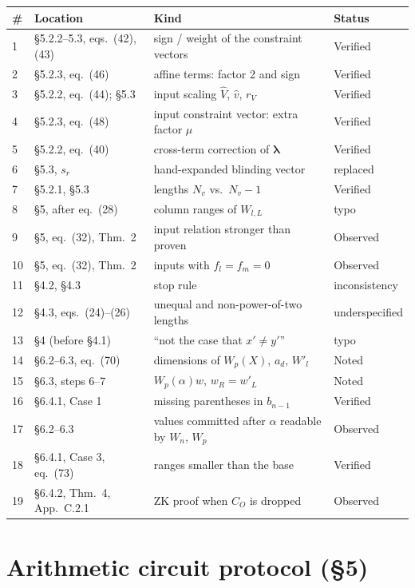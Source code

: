 \documentclass[11pt,a4paper]{article}
\newcommand{\blam}{\boldsymbol{\lambda}}
\begin{document}
\begin{center}
\begin{tabular}{@{}llll@{}}
\toprule
\# & Location & Kind & Status\\
\midrule
1 & \S5.2.2--5.3, eqs.\ (42), (43) & sign / weight of the constraint vectors & Verified\\
2 & \S5.2.3, eq.\ (46) & affine terms: factor 2 and sign & Verified\\
3 & \S5.2.2, eq.\ (44); \S5.3 & input scaling $\hat V$, $\hat v$, $r_V$ & Verified\\
4 & \S5.2.3, eq.\ (48) & input constraint vector: extra factor $\mu$ & Verified\\
5 & \S5.2.2, eq.\ (40) & cross-term correction of $\blam$ & Verified\\
6 & \S5.3, $s_r$ & hand-expanded blinding vector & replaced\\
7 & \S5.2.1, \S5.3 & lengths $N_v$ vs.\ $N_v - 1$ & Verified\\
8 & \S5, after eq.\ (28) & column ranges of $W_{l,L}$ & typo\\
9 & \S5, eq.\ (32), Thm.\ 2 & input relation stronger than proven & Observed\\
10 & \S5, eq.\ (32), Thm.\ 2 & inputs with $f_l = f_m = 0$ & Observed\\
11 & \S4.2, \S4.3 & stop rule & inconsistency\\
12 & \S4.3, eqs.\ (24)--(26) & unequal and non-power-of-two lengths & underspecified\\
13 & \S4 (before \S4.1) & ``not the case that $x' \ne y'$'' & typo\\
14 & \S6.2--6.3, eq.\ (70) & dimensions of $W_p(X)$, $a_d$, $W'_l$ & Noted\\
15 & \S6.3, steps 6--7 & $W_p(\alpha)w$, $w_R = w'_L$ & Noted\\
16 & \S6.4.1, Case 1 & missing parentheses in $b_{n-1}$ & Verified\\
17 & \S6.2--6.3 & values committed after $\alpha$ readable by $W_n$, $W_p$ & Observed\\
18 & \S6.4.1, Case 3, eq.\ (73) & ranges smaller than the base & Verified\\
19 & \S6.4.2, Thm.~4, App.~C.2.1 & ZK proof when $C_O$ is dropped & Observed\\
\bottomrule
\end{tabular}
\end{center}

\section{Arithmetic circuit protocol (\S5)}
\end{document}
